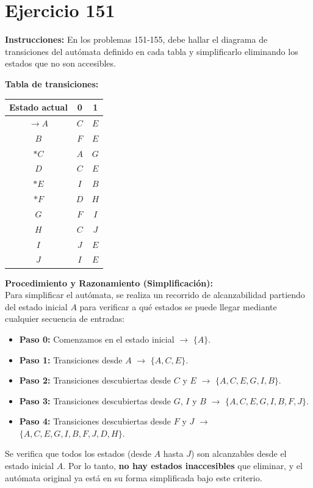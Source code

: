 \documentclass[12pt]{article}
\begin{document}
\section*{Ejercicio 151}

\textbf{Instrucciones:} En los problemas 151-155, debe hallar el diagrama de transiciones del autómata definido en cada tabla y simplificarlo eliminando los estados que no son accesibles.

\vspace{0.5cm}

\textbf{Tabla de transiciones:}

\begin{center}
\begin{tabular}{|c|c|c|}
\hline
\textbf{Estado actual} & \textbf{0} & \textbf{1} \\
\hline
$\rightarrow A$ & $C$ & $E$ \\
\hline
$B$ & $F$ & $E$ \\
\hline
$*C$ & $A$ & $G$ \\
\hline
$D$ & $C$ & $E$ \\
\hline
$*E$ & $I$ & $B$ \\
\hline
$*F$ & $D$ & $H$ \\
\hline
$G$ & $F$ & $I$ \\
\hline
$H$ & $C$ & $J$ \\
\hline
$I$ & $J$ & $E$ \\
\hline
$J$ & $I$ & $E$ \\
\hline
\end{tabular}
\end{center}

\vspace{0.5cm}

\textbf{Procedimiento y Razonamiento (Simplificación):} \\
Para simplificar el autómata, se realiza un recorrido de alcanzabilidad partiendo del estado inicial $A$ para verificar a qué estados se puede llegar mediante cualquier secuencia de entradas:
\begin{itemize}
    \item \textbf{Paso 0:} Comenzamos en el estado inicial $\rightarrow$ $\{A\}$.
    \item \textbf{Paso 1:} Transiciones desde $A$ $\rightarrow$ $\{A, C, E\}$.
    \item \textbf{Paso 2:} Transiciones descubiertas desde $C$ y $E$ $\rightarrow$ $\{A, C, E, G, I, B\}$.
    \item \textbf{Paso 3:} Transiciones descubiertas desde $G$, $I$ y $B$ $\rightarrow$ $\{A, C, E, G, I, B, F, J\}$.
    \item \textbf{Paso 4:} Transiciones descubiertas desde $F$ y $J$ $\rightarrow$ $\{A, C, E, G, I, B, F, J, D, H\}$.
\end{itemize}
Se verifica que todos los estados (desde $A$ hasta $J$) son alcanzables desde el estado inicial $A$. Por lo tanto, \textbf{no hay estados inaccesibles} que eliminar, y el autómata original ya está en su forma simplificada bajo este criterio.
\end{document}
